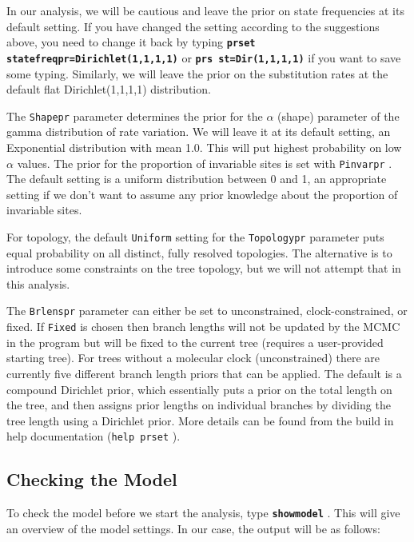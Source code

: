 \documentclass[12pt]{book}
\newcommand{\ttt}[1]{\texttt{#1} }
\newcommand{\tb}[1]{\ttt{\textbf{#1}} }
\begin{document}
In our analysis, we will be cautious and leave the prior on state frequencies at its default
setting. If you have changed the setting according to the suggestions above, you need to change it
back by typing \tb{prset statefreqpr=Dirichlet(1,1,1,1)} or \tb{prs st=Dir(1,1,1,1)} if
you want to save some typing. Similarly, we will leave the prior on the substitution rates at the
default flat Dirichlet(1,1,1,1) distribution.

The \ttt{Shapepr} parameter determines the prior for the $\alpha$ (shape) parameter of the gamma
distribution of rate variation. We will leave it at its default setting, an Exponential
distribution with mean 1.0. This will put highest probability on low $\alpha$ values. 
The prior for the proportion of invariable sites is set with \ttt{Pinvarpr}. The default setting
is a uniform distribution between 0 and 1, an appropriate setting if we don't want to assume any
prior knowledge about the proportion of invariable sites.

For topology, the default \ttt{Uniform} setting for the \ttt{Topologypr} parameter puts equal
probability on all distinct, fully resolved topologies. The alternative is to introduce some
constraints on the tree topology, but we will not attempt that in this analysis.

The \ttt{Brlenspr} parameter can either be set to unconstrained, clock-constrained, or fixed. If
\ttt{Fixed} is chosen then branch lengths will not be updated by the MCMC in the program but
will be fixed to the current tree (requires a user-provided starting tree).
For trees without a molecular clock (unconstrained) there are currently five different branch
length priors that can be applied. The default is a compound Dirichlet prior, which essentially
puts a prior on the total length on the tree, and then assigns prior lengths on individual branches
by dividing the tree length using a Dirichlet prior. More details can be found from the build in
help documentation (\ttt{help prset}).
 

\subsection{Checking the Model}

To check the model before we start the analysis, type \tb{showmodel}. This will give an
overview of the model settings. In our case, the output will be as follows:
\end{document}
